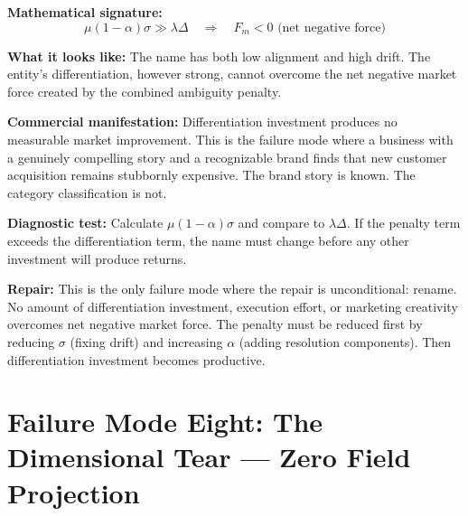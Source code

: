 \documentclass[12pt, openany]{book}
\theoremstyle{thmstyle}
\theoremstyle{defstyle}
\begin{document}
\begin{failbox}
\textbf{Mathematical signature:}
\[
\mu(1-\alpha)\sigma \gg \lambda\Delta \quad \Rightarrow \quad F_m < 0 \text{ (net negative force)}
\]

\textbf{What it looks like:} The name has both low alignment and high drift. The entity's differentiation, however strong, cannot overcome the net negative market force created by the combined ambiguity penalty.

\textbf{Commercial manifestation:} Differentiation investment produces no measurable market improvement. This is the failure mode where a business with a genuinely compelling story and a recognizable brand finds that new customer acquisition remains stubbornly expensive. The brand story is known. The category classification is not.

\textbf{Diagnostic test:} Calculate $\mu(1-\alpha)\sigma$ and compare to $\lambda\Delta$. If the penalty term exceeds the differentiation term, the name must change before any other investment will produce returns.

\textbf{Repair:} This is the only failure mode where the repair is unconditional: rename. No amount of differentiation investment, execution effort, or marketing creativity overcomes net negative market force. The penalty must be reduced first by reducing $\sigma$ (fixing drift) and increasing $\alpha$ (adding resolution components). Then differentiation investment becomes productive.
\end{failbox}

\section{Failure Mode Eight: The Dimensional Tear --- Zero Field Projection}
\end{document}
